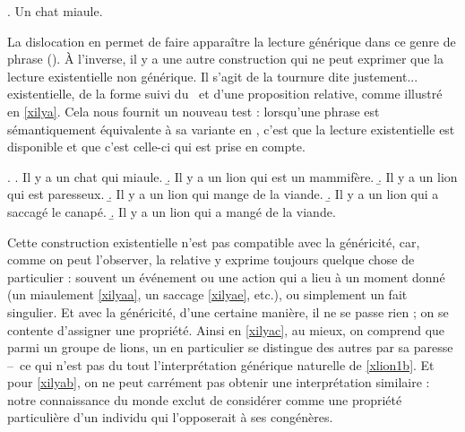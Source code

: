 \ex. \label{xchatm}
Un chat miaule.


La dislocation en  permet de faire apparaître la
lecture générique dans ce genre de phrase (). À l'inverse, il y a une autre construction qui ne peut
exprimer que la lecture existentielle non générique.  Il s'agit de la
tournure dite justement... existentielle, de la forme 
 suivi du \GN\ et d'une proposition relative, comme
illustré en \ref{xilya}. Cela nous fournit un nouveau test :
lorsqu'une phrase est sémantiquement équivalente à sa variante en
, c'est que la lecture existentielle est disponible et
que c'est celle-ci qui est prise en compte. 

\ex. \label{xilya}
\a. Il y a un chat qui miaule. \label{xilyaa}
\b. \juge\zarb Il y a un lion qui est un mammifère. \label{xilyab}
\b. \juge{\urgh} Il y a un lion qui est \label{xilyac}paresseux.
\b. Il y a un lion qui mange de la viande.
\b. Il y a un lion qui a saccagé le canapé. \label{xilyae}
\b. Il y a un lion qui a mangé de la viande.



Cette construction existentielle n'est pas compatible avec la
généricité, car, comme on peut l'observer, la relative y exprime
toujours quelque chose de particulier : souvent un événement ou une
action qui a lieu à un moment donné (un miaulement \ref{xilyaa}, un
saccage \ref{xilyae}, etc.),
ou simplement un fait singulier.  
Et avec la généricité, d'une certaine manière, il ne se passe rien ;
on se contente d'assigner une propriété.
Ainsi en \ref{xilyac}, au mieux, on comprend que
parmi un groupe de lions, un en particulier se distingue des autres
par sa paresse --~ce qui n'est pas du tout l'interprétation générique
naturelle de \ref{xlion1b}.  Et pour \ref{xilyab}, on ne peut
carrément pas obtenir une interprétation similaire : notre
connaissance du monde exclut de considérer 
comme une propriété particulière d'un individu qui l'opposerait à ses
congénères.


